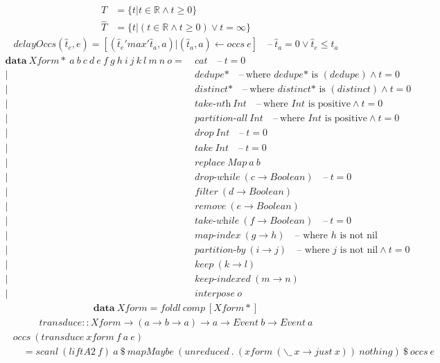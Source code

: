 \documentclass[fleqn]{amsart}
\newcommand{\dash}{\quad\text{--}\ }
\newcommand{\epoch}{t = 0}
\newcommand{\zeroarity}[1]{&\ \textit{#1*} \dash \text{where }\textit{#1*}\text{ is }(#1)}
\newcommand{\positive}[1]{&\ \textit{#1}\ Int \dash \text{where }Int\text{ is positive}}
\newcommand{\integer}[1]{&\ #1\ Int}
\newcommand{\predicate}[2]{&\ \textit{#1}\ (#2 \rightarrow Boolean)}
\newcommand{\nonnillable}[3]{&\ \textit{#1}\ (#2 \rightarrow #3)\quad\text{-- where }#3\text{ is not nil}}
\newcommand{\any}[3]{&\ \textit{#1}\ (#2 \rightarrow #3)}
\begin{document}
\begin{align*}
  T &= \{t | t \in \mathbb{R} \land t \ge 0\}\\
  \hat{T} &= \{t | (t \in \mathbb{R} \land t \ge 0) \lor t = \infty\}
\end{align*}
\begin{align*}
  delayOccs(\hat{t}_e, e) = [(\hat{t}_e  'max' \hat{t}_a, a) | (\hat{t}_a, a) \leftarrow occs\ e] \dash \hat{t}_a = 0 \lor \hat{t}_e \leq \hat{t}_a
\end{align*}
\begin{align*}
  \mathbf{data}\ Xform{*}\ a\ b\ c\ d\ e\ f\ g\ h\ i\ j\ k\ l\ m\ n\ o =&\ cat \dash \epoch\\
  |\zeroarity{dedupe} \land \epoch\\
  |\zeroarity{distinct} \land \epoch\\
  |\positive{take-nth} \land \epoch\\
  |\positive{partition-all} \land \epoch\\
  |\integer{drop} \dash \epoch\\
  |\integer{take} \dash \epoch\\
  |&\ replace\ Map\ a\ b\\
  |\predicate{drop-while}{c} \dash \epoch\\
  |\predicate{filter}{d}\\
  |\predicate{remove}{e}\\
  |\predicate{take-while}{f} \dash \epoch\\
  |\nonnillable{map-index}{g}{h}\\
  |\nonnillable{partition-by}{i}{j} \land \epoch\\
  |\any{keep}{k}{l}\\
  |\any{keep-indexed}{m}{n}\\
  |&\ interpose\ o
\end{align*}
\begin{align*}
  \mathbf{data}\ Xform = foldl\ comp\ [Xform*]
\end{align*}
\begin{align*}
  transduce :: Xform \rightarrow (a \rightarrow b \rightarrow a) \rightarrow a \rightarrow Event\ b \rightarrow Event\ a
\end{align*}
\begin{align*}
  &occs\ (transduce\ xform\ f\ a\ e)\\
  &\quad= scanl\ (liftA2\ f)\ a\ \$\ mapMaybe\ (unreduced\ .\ (xform\ (\backslash\_\ x\rightarrow just\ x))\ nothing)\ \$\ occs\ e
\end{align*}
\end{document}
